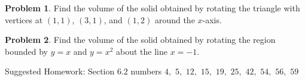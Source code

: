 \documentclass[letterpaper, twoside, 12pt]{book}
\theoremstyle{definition}
\newtheorem{theorem}{Theorem}
\theoremstyle{definition}
\newtheorem{motivation}[theorem]{Motivation}
\newtheorem{problem}[theorem]{Problem}
\begin{document}
\begin{problem}
 Find the volume of the solid obtained by rotating the triangle with
 vertices at $(1,1)$, $(3,1)$, and $(1,2)$ around the $x$-axis.
\end{problem}

\vfill

\begin{problem}
 Find the volume of the solid obtained by rotating the region bounded by
 $y=x$ and $y=x^2$ about the line $x = -1$.
\end{problem}

\vfill

\noindent Suggested Homework: Section $6.2$ numbers $4,$ $5,$ $12,$ $15,$ $19,$ $25,$ $42,$ $54,$ $56,$ $59$
\newpage





\end{document}
